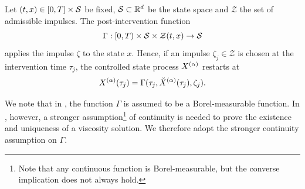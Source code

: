 \begin{definition}
\label{def: Post-intervention Function}
    Let $(t,x) \in [0,T] \times \mathcal{S}$ be fixed, $\mathcal{S} \subset \mathbb{R}^d$ be the state space and $\mathcal Z$ the set of admissible impulses. The post-intervention function
    \begin{equation*}
        \Gamma: [0,T) \times \mathcal{S} \times \mathcal Z(t,x) \rightarrow \mathcal{S}
    \end{equation*}
    applies the impulse $\zeta$ to the state $x$. Hence, if an impulse $\zeta_j \in \mathcal Z$ is chosen at the intervention time $\tau_j$, the controlled state process $X^{(\alpha)}$ restarts at
    \begin{equation*}
        X^{(\alpha)} (\tau_j) = \Gamma (\tau_j, \check{X}^{(\alpha)}(\tau_j), \zeta_j).
    \end{equation*}
\end{definition}
\begin{remark}
    We note that in \cite{oksendal2007applied}, the function $\Gamma$ is assumed to be a Borel-measurable function. In \cite{seydel2010generalexistenceuniquenessviscosity}, however, a stronger assumption\footnote{Note that any continuous function is Borel-measurable, but the converse implication does not always hold.} of continuity is needed to prove the existence and uniqueness of a viscosity solution. We therefore adopt the stronger continuity assumption on $\Gamma$.
\end{remark}

